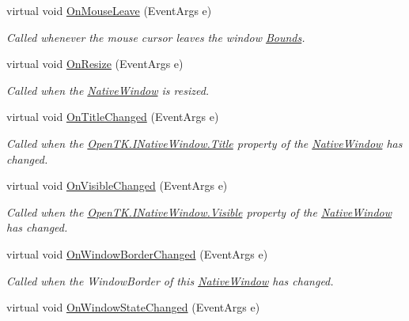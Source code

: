 \begin{DoxyCompactItemize}
virtual void \hyperlink{class_open_t_k_1_1_native_window_a617fe22d2fe135ea57d098bef3113792}{On\-Mouse\-Leave} (Event\-Args e)
\begin{DoxyCompactList}\small\item\em Called whenever the mouse cursor leaves the window \hyperlink{class_open_t_k_1_1_native_window_ac0325973134062eba62484df45236464}{Bounds}. \end{DoxyCompactList}\item 
virtual void \hyperlink{class_open_t_k_1_1_native_window_a647ac43f6e6844ce93c1182579c0dbe4}{On\-Resize} (Event\-Args e)
\begin{DoxyCompactList}\small\item\em Called when the \hyperlink{class_open_t_k_1_1_native_window}{Native\-Window} is resized. \end{DoxyCompactList}\item 
virtual void \hyperlink{class_open_t_k_1_1_native_window_aff47a44bbfd91b63a4c95070462d9b25}{On\-Title\-Changed} (Event\-Args e)
\begin{DoxyCompactList}\small\item\em Called when the \hyperlink{interface_open_t_k_1_1_i_native_window_acc6e79eb06f9e7d725f6eac5ac1df71d}{Open\-T\-K.\-I\-Native\-Window.\-Title} property of the \hyperlink{class_open_t_k_1_1_native_window}{Native\-Window} has changed. \end{DoxyCompactList}\item 
virtual void \hyperlink{class_open_t_k_1_1_native_window_ad007ba290983c3aaf8e1b32c47d7b90b}{On\-Visible\-Changed} (Event\-Args e)
\begin{DoxyCompactList}\small\item\em Called when the \hyperlink{interface_open_t_k_1_1_i_native_window_ac455c50c69983d4a26e7ed61336290d8}{Open\-T\-K.\-I\-Native\-Window.\-Visible} property of the \hyperlink{class_open_t_k_1_1_native_window}{Native\-Window} has changed. \end{DoxyCompactList}\item 
virtual void \hyperlink{class_open_t_k_1_1_native_window_a901e27ea7e489bf53ee2d7c9fa43d83e}{On\-Window\-Border\-Changed} (Event\-Args e)
\begin{DoxyCompactList}\small\item\em Called when the Window\-Border of this \hyperlink{class_open_t_k_1_1_native_window}{Native\-Window} has changed. \end{DoxyCompactList}\item 
virtual void \hyperlink{class_open_t_k_1_1_native_window_ac185465ace10f266e5f723c792a04260}{On\-Window\-State\-Changed} (Event\-Args e)

\end{DoxyCompactItemize}
